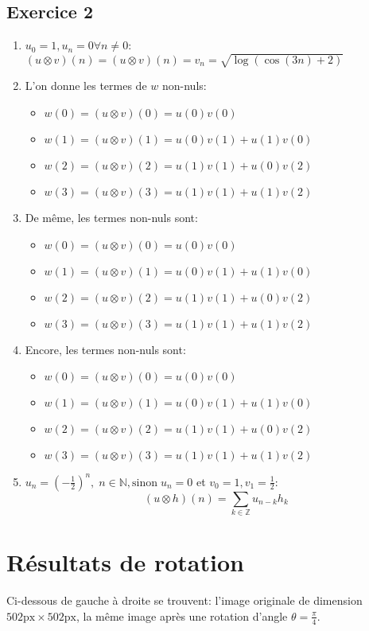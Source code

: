 \documentclass[12pt]{article}
\begin{document}
\subsection*{Exercice 2}
\begin{enumerate}
\item $u_0 = 1, u_n = 0 \forall n \neq 0$: \newline
$(u \otimes v)(n) = (u \otimes v)(n) = v_n = \sqrt{\log(\cos(3n)+2)}$ 
\item L'on donne les termes de $w$ non-nuls:
\begin{itemize}
\item $w(0) = (u \otimes v)(0) = u(0) v(0)$
\item $w(1) = (u \otimes v)(1) = u(0) v(1) + u(1) v(0)$
\item $w(2) = (u \otimes v)(2) = u(1) v(1) + u(0) v(2)$
\item $w(3) = (u \otimes v)(3) = u(1) v(1) + u(1) v(2)$
\end{itemize}
\item De même, les termes non-nuls sont:
\begin{itemize}
\item $w(0) = (u \otimes v)(0) = u(0) v(0)$
\item $w(1) = (u \otimes v)(1) = u(0) v(1) + u(1) v(0)$
\item $w(2) = (u \otimes v)(2) = u(1) v(1) + u(0) v(2)$
\item $w(3) = (u \otimes v)(3) = u(1) v(1) + u(1) v(2)$
\end{itemize}
\item Encore, les termes non-nuls sont:
\begin{itemize}
\item $w(0) = (u \otimes v)(0) = u(0) v(0)$
\item $w(1) = (u \otimes v)(1) = u(0) v(1) + u(1) v(0)$
\item $w(2) = (u \otimes v)(2) = u(1) v(1) + u(0) v(2)$
\item $w(3) = (u \otimes v)(3) = u(1) v(1) + u(1) v(2)$
\end{itemize}
\item $u_n = (-\frac{1}{2})^n, \; n \in \mathbb{N}, \text{sinon} \; u_n = 0$ et $v_0 = 1, v_1 = \frac{1}{2}$: \newline
$$ (u \otimes h)(n) = \sum_{k \in \mathbb{Z}} u_{n-k}h_k $$
\end{enumerate}

\section*{Résultats de rotation}
Ci-dessous de gauche à droite se trouvent: l'image originale de dimension $502\text{px} \times 502 \text{px}$, la même image après une rotation d'angle $\theta = \frac{\pi}{4}$.
\end{document}

